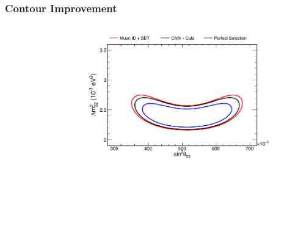 \documentclass[10pt,professionalfonts,xcolor=table]{beamer}
\begin{document}
\begin{frame}
\frametitle{Contour Improvement}
\centering
\includegraphics[angle=-90, width=0.9\textwidth]{figures/selection/contoursfhc1cosmic.pdf}
\end{frame}
\end{document}
